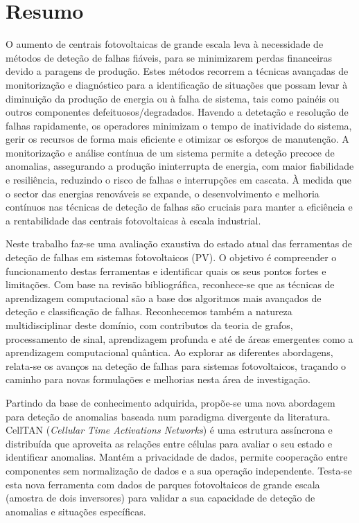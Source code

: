 \chapter*{Resumo}

O aumento de centrais fotovoltaicas de grande escala leva à necessidade de métodos de deteção de falhas fiáveis, para se minimizarem perdas financeiras devido a paragens de produção. Estes métodos recorrem a técnicas avançadas de monitorização e diagnóstico para a identificação de situações que possam levar à diminuição da produção de energia ou à falha de sistema, tais como painéis ou outros componentes defeituosos/degradados. Havendo a detetação e resolução de falhas rapidamente, os operadores minimizam o tempo de inatividade do sistema, gerir os recursos de forma mais eficiente e otimizar os esforços de manutenção. A monitorização e análise contínua de um sistema permite a deteção precoce de anomalias, assegurando a produção ininterrupta de energia, com maior fiabilidade e resiliência, reduzindo o risco de falhas e interrupções em cascata. À medida que o sector das energias renováveis se expande, o desenvolvimento e melhoria contínuos nas técnicas de deteção de falhas são cruciais para manter a eficiência e a rentabilidade das centrais fotovoltaicas à escala industrial.

Neste trabalho faz-se uma avaliação exaustiva do estado atual das ferramentas de deteção de falhas em sistemas fotovoltaicos (PV). O objetivo é compreender o funcionamento destas ferramentas e identificar quais os seus pontos fortes e limitações. Com base na revisão bibliográfica, reconhece-se que as técnicas de aprendizagem computacional são a base dos algoritmos mais avançados de deteção e classificação de falhas. Reconhecemos também a natureza multidisciplinar deste domínio, com contributos da teoria de grafos, processamento de sinal, aprendizagem profunda e até de áreas emergentes como a aprendizagem computacional quântica. Ao explorar as diferentes abordagens, relata-se os avanços na deteção de falhas para sistemas fotovoltaicos, traçando o caminho para novas formulações e melhorias nesta área de investigação.

Partindo da base de conhecimento adquirida, propõe-se uma nova abordagem para deteção de anomalias baseada num paradigma divergente da literatura. CellTAN (\textit{Cellular Time Activations Networks}) é uma estrutura assíncrona e distribuída que aproveita as relações entre células para avaliar o seu estado e identificar anomalias. Mantém a privacidade de dados, permite cooperação entre componentes sem normalização de dados e a sua operação independente.
Testa-se esta nova ferramenta com dados de parques fotovoltaicos de grande escala (amostra de dois inversores) para validar a sua capacidade de deteção de anomalias e situações específicas.

